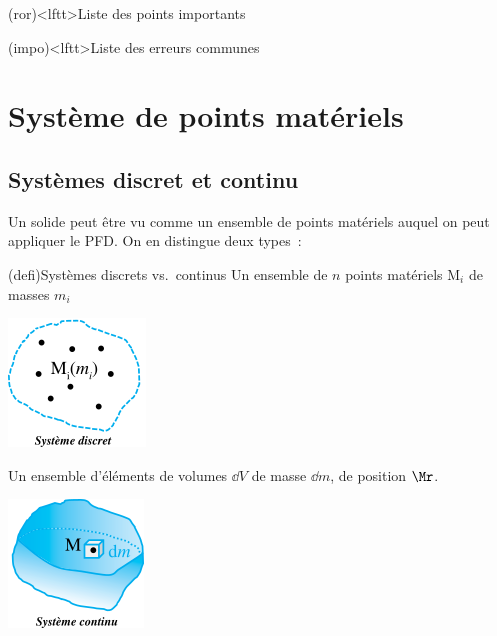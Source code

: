 \documentclass[../../main/main.tex]{subfiles}
\begin{document}
\begin{boxes}
	\begin{tcb}(ror)<lftt>{Liste des points importants}
	\end{tcb}
	\begin{tcb}(impo)<lftt>{Liste des erreurs communes}
	\end{tcb}
\end{boxes}
\vspace*{\fill}
\newpage


\section{Système de points matériels}
\subsection{Systèmes discret et continu}
Un solide peut être vu comme un ensemble de points matériels auquel on peut
appliquer le PFD. On en distingue deux types~:
\begin{tcb*}[sidebyside](defi){Systèmes discrets vs.\ continus}
	Un ensemble de $n$ points matériels M$_i$ de masses $m_i$
	\begin{center}
		\includegraphics[scale=1]{discret.png}
	\end{center}
	\tcblower
	Un ensemble d'éléments de volumes $\dd{V}$ de masse $\dd{m}$, de position
	$\Mr$.
	\begin{center}
		\includegraphics[scale=1]{cont.png}
	\end{center}
\end{tcb*}
\end{document}
